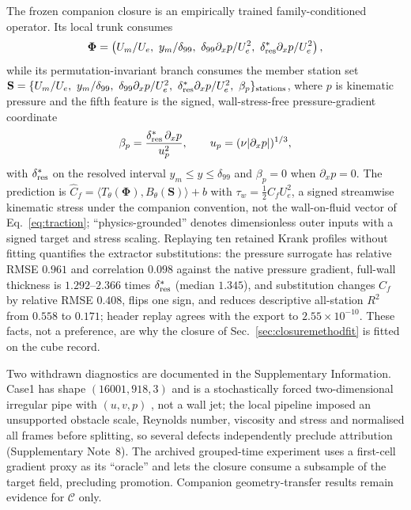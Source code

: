 The frozen companion closure is an empirically trained family-conditioned operator. Its local
trunk consumes
\begin{equation}
\boldsymbol\Phi=
\left(U_m/U_e,\ y_m/\delta_{99},\
\delta_{99}\partial_xp/U_e^2,\
\delta^\ast_{\rm res}\partial_xp/U_e^2\right),
\label{eq:localfeatures}
\end{equation}
while its permutation-invariant branch consumes the member station set
$\mathbf S=\{U_m/U_e,\ y_m/\delta_{99},\ \delta_{99}\partial_xp/U_e^2,\
\delta^\ast_{\rm res}\partial_xp/U_e^2,\ \beta_p\}_{\rm stations}$, where $p$ is kinematic
pressure and the fifth feature is the signed, wall-stress-free pressure-gradient coordinate
\begin{equation}
\beta_p=\frac{\delta^\ast_{\rm res}\,\partial_xp}{u_p^2},\qquad
u_p=(\nu|\partial_xp|)^{1/3},
\label{eq:betap}
\end{equation}
with $\delta^\ast_{\rm res}$ on the resolved interval $y_m\leq y\leq\delta_{99}$ and
$\beta_p=0$ when $\partial_xp=0$. The prediction is
$\widehat C_f=\langle T_\theta(\boldsymbol\Phi),B_\theta(\mathbf S)\rangle+b$ with
$\tau_w=\tfrac12 C_f U_e^2$, a signed streamwise kinematic stress under the companion convention,
not the wall-on-fluid vector of Eq.~\eqref{eq:traction}; ``physics-grounded'' denotes
dimensionless outer inputs with a signed target and stress scaling. Replaying ten retained Krank profiles without
fitting quantifies the extractor substitutions: the pressure surrogate has relative RMSE $0.961$
and correlation $0.098$ against the native pressure gradient, full-wall thickness is
$1.292$--$2.366$ times $\delta^\ast_{\rm res}$ (median $1.345$), and substitution changes $C_f$ by
relative RMSE $0.408$, flips one sign, and reduces descriptive all-station $R^2$ from $0.558$ to
$0.171$; header replay agrees with the export to $2.55\times10^{-10}$. These facts, not a
preference, are why the closure of Sec.~\ref{sec:closuremethodfit} is fitted on the cube record.

Two withdrawn diagnostics are documented in the Supplementary Information. Case1 has shape
$(16001,918,3)$ and is a stochastically forced two-dimensional irregular pipe with $(u,v,p)$
\cite{du2024confild}, not a wall jet; the local pipeline imposed an unsupported obstacle scale,
Reynolds number, viscosity and stress and normalised all frames before splitting, so several
defects independently preclude attribution (Supplementary Note~8). The archived grouped-time
experiment uses a first-cell gradient proxy as its ``oracle'' and lets the closure consume a
subsample of the target field, precluding promotion. Companion geometry-transfer results
remain evidence for $\mathcal C$ only.

